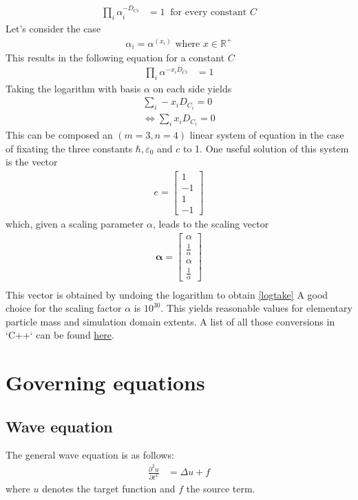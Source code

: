 \documentclass[10pt]{report}
\let\Chapter\chapter
\def\chapter{\addtocontents{lol}{\protect\addvspace{10pt}}\Chapter}
\begin{document}
\begin{align*} 
\prod_i \alpha_i^{-D_{\text{C} i}} &= 1 \ \text{   for every constant  } C \end{align*}
Let's consider the case \begin{align*} \alpha_i = \alpha^(x_i) \text{ where } x \in \mathbb{R}^+ \end{align*}
This results in the following equation for a constant $C$
\begin{align*}
\prod_{i} \alpha^{- x_i D_{C i}} &= 1
\end{align*}
Taking the logarithm with basis $\alpha$ on each side yields
\begin{align} 
    \sum_{i} - x_i D_{C_i} = 0 \\ \iff \sum_{i} x_i D_{C_i} = 0 
\end{align} \label{logtake}
This can be composed an $(m = 3, n = 4)$ linear system of equation in the case of fixating the three constants $\hbar, \varepsilon_0$ and $c$ to 1.
One useful solution of this system is the vector 
\begin{align*} 
e = \begin{bmatrix} 1 \\ -1 \\ 1 \\ -1 \end{bmatrix} 
\end{align*} 
which, given a scaling parameter $\alpha$, leads to the scaling vector 
\begin{align*} 
\mathbf{\alpha} = \begin{bmatrix} \alpha \\ \frac{1}{\alpha} \\ \alpha \\ \frac{1}{\alpha} \end{bmatrix} \\
\end{align*} 
This vector is obtained by undoing the logarithm to obtain \ref{logtake}
A good choice for the scaling factor $\alpha$ is $10^{30}$. This yields reasonable values for elementary particle mass and simulation domain extents. A list of all those conversions in `C++` can be found \href{https://gitlab.psi.ch/AMAS-students/winkler_msc/-/blob/main/experiments/cfg.hpp}{here}.
\chapter{Governing equations} \label{governing_eq}
\section{Wave equation} 
The general wave equation is as follows:
\begin{align} 
\frac{\partial^2 u}{\partial t^2} &= \Delta u + f 
\end{align}\label{wave_equation_general}
where $u$ denotes the target function and $f$ the source term.
\end{document}
